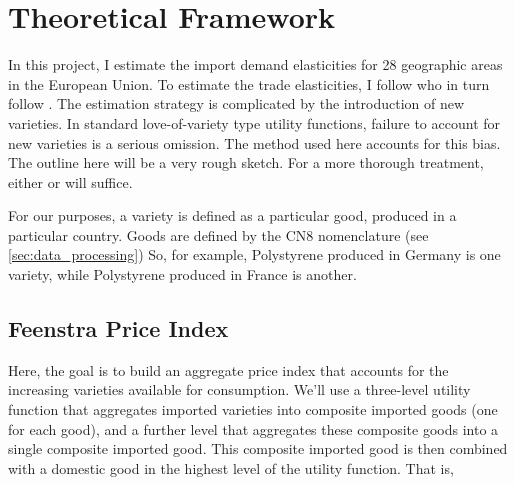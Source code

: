 \documentclass[12pt,a4paper]{article}                      %
\begin{document}


\section{Theoretical Framework}
\label{sec:theoretical_framework}
In this project, I estimate the import demand elasticities for 28 geographic areas in the European Union.
To estimate the trade elasticities, I follow \cite{broda_weinstein_2006_globalization_gains} who in turn follow \cite{feenstra_1994_new_product_varieties}.
The estimation strategy is complicated by the introduction of new varieties.
In standard love-of-variety type utility functions, failure to account for new varieties is a serious omission.
The method used here accounts for this bias.
The outline here will be a very rough sketch.  For a more thorough treatment, either \cite{feenstra_1994_new_product_varieties} or \cite{broda_weinstein_2006_globalization_gains} will suffice.

For our purposes, a variety is defined as a particular good, produced in a particular country. Goods are defined by the CN8 nomenclature (see \ref{sec:data_processing}) So, for example, Polystyrene produced in Germany is one variety, while Polystyrene produced in France is another.

\subsection{Feenstra Price Index}
\label{sub:feenstra_price_index}

Here, the goal is to build an aggregate price index that accounts for the increasing varieties available for consumption.  We'll use a three-level utility function that aggregates imported varieties into composite imported goods (one for each good), and a further level that aggregates these composite goods into a single composite imported good.  This composite imported good is then combined with a domestic good in the highest level of the utility function.  That is,
\end{document}
